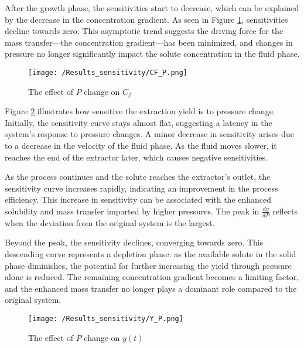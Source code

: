 \documentclass[../Article_Sensitivity_Analsysis.tex]{subfiles}
\begin{document}
	After the growth phase, the sensitivities start to decrease, which can be explained by the decrease in the concentration gradient. As seen in Figure \ref{fig:Sensitivty_P_CF}, sensitivities decline towards zero. This asymptotic trend suggests the driving force for the mass transfer—the concentration gradient—has been minimized, and changes in pressure no longer significantly impact the solute concentration in the fluid phase.
	
	\begin{figure}[h!]
		\centering
		\texttt{[image: /Results\_sensitivity/CF\_P.png]}
		\caption{The effect of $P$ change on $C_f$}
		\label{fig:Sensitivty_P_CF}
	\end{figure}
	
	Figure \ref{fig:Sensitivty_P_y} illustrates how sensitive the extraction yield is to pressure change. Initially, the sensitivity curve stays almost flat, suggesting a latency in the system's response to pressure changes. A minor decrease in sensitivity arises due to a decrease in the velocity of the fluid phase. As the fluid moves slower, it reaches the end of the extractor later, which causes negative sensitivities.
	
	As the process continues and the solute reaches the extractor's outlet, the sensitivity curve increases rapidly, indicating an improvement in the process efficiency. This increase in sensitivity can be associated with the enhanced solubility and mass transfer imparted by higher pressures. The peak in $\frac{dy}{dP}$ reflects when the deviation from the original system is the largest.
	
	Beyond the peak, the sensitivity declines, converging towards zero. This descending curve represents a depletion phase: as the available solute in the solid phase diminishes, the potential for further increasing the yield through pressure alone is reduced. The remaining concentration gradient becomes a limiting factor, and the enhanced mass transfer no longer plays a dominant role compared to the original system.
	
	\begin{figure}[h!]
		\centering
		\texttt{[image: /Results\_sensitivity/Y\_P.png]}
		\caption{The effect of $P$ change on $y(t)$}
		\label{fig:Sensitivty_P_y}
	\end{figure}
		
\end{document}

